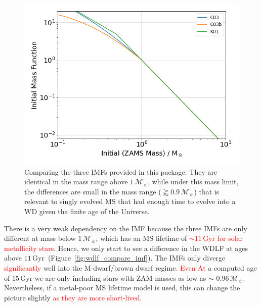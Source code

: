 \documentclass[fleqn,usenatbib]{rasti}
\newcommand{\msun}{\mathcal{M}_{\sun}}
\begin{document}
\begin{figure}
    \centering
    \includegraphics[width=\columnwidth]{fig_04_imfs.png}
    \caption{Comparing the three IMFs provided in this package. They are
    identical in the mass range above $1\,\msun$, while under this mass
    limit, the differences are small in the mass range ($\gtrapprox0.9\,\msun$)
    that is relevant to singly evolved MS that had enough time to evolve into a
    WD given the finite age of the Universe.}
    \label{fig:imfs}
\end{figure}

There is a very weak dependency on the IMF because the three IMFs are only
different at mass below $1\,\msun$, which has an MS lifetime of
\textcolor{red}{$\sim11$\,Gyr for solar metallicity stars.} Hence, we only
start to see a difference in the WDLF at ages above
$11$\,Gyr~(Figure~\ref{fig:wdlf_compare_imf}). The IMFs only diverge
\textcolor{red}{significantly} well into the M-dwarf/brown dwarf
regime\textcolor{red}{. Even At} a computed age of $15$\,Gyr
we are only including stars with ZAM masses as low as $\sim$ $0.96\,\msun$.
Nevertheless, if a metal-poor MS lifetime model is used, this can change the
picture slightly \textcolor{red}{as they are more short-lived}.
\end{document}
